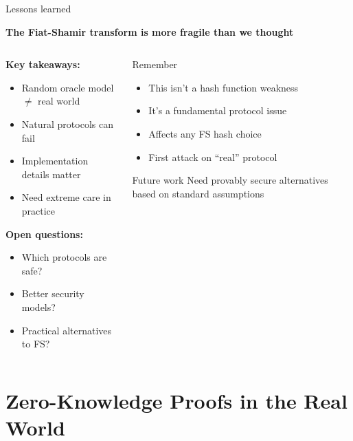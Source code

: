 \documentclass[aspectratio=169, lualatex, handout]{beamer}
\begin{document}
\begin{frame}{Lessons learned}
	\begin{center}
		\textbf{The Fiat-Shamir transform is more fragile than we thought}
	\end{center}
	\vspace{0.5em}
	\begin{columns}[c]
		\begin{column}{0.5\textwidth}
			\textbf{Key takeaways:}
			\begin{itemize}
				\item Random oracle model $\neq$ real world
				\item Natural protocols can fail
				\item Implementation details matter
				\item Need extreme care in practice
			\end{itemize}
			\vspace{0.5em}
			\textbf{Open questions:}
			\begin{itemize}
				\item Which protocols are safe?
				\item Better security models?
				\item Practical alternatives to FS?
			\end{itemize}
		\end{column}
		\begin{column}{0.5\textwidth}
			\begin{alertblock}{Remember}
				\begin{itemize}
					\item This isn't a hash function weakness
					\item It's a fundamental protocol issue
					\item Affects any FS hash choice
					\item First attack on ``real'' protocol
				\end{itemize}
			\end{alertblock}
			\vspace{0.5em}
			\begin{exampleblock}{Future work}
				Need provably secure alternatives based on standard assumptions
			\end{exampleblock}
		\end{column}
	\end{columns}
\end{frame}

\section{Zero-Knowledge Proofs in the Real World}
\end{document}
